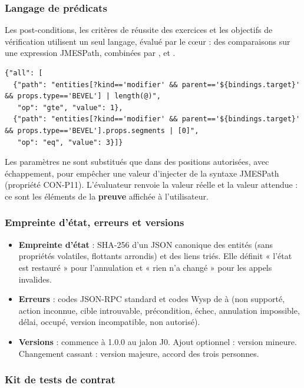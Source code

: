 \subsubsection{Langage de prédicats}

Les post-conditions, les critères de réussite des exercices et les objectifs de vérification utilisent un seul langage, évalué par le cœur : des comparaisons sur une expression JMESPath, combinées par ,  et .

\begin{lstlisting}[language={}]
{"all": [
  {"path": "entities[?kind=='modifier' && parent=='${bindings.target}' && props.type=='BEVEL'] | length(@)",
   "op": "gte", "value": 1},
  {"path": "entities[?kind=='modifier' && parent=='${bindings.target}' && props.type=='BEVEL'].props.segments | [0]",
   "op": "eq", "value": 3}]}
\end{lstlisting}

Les paramètres ne sont substitués que dans des positions autorisées, avec échappement, pour empêcher une valeur d'injecter de la syntaxe JMESPath (propriété CON-P11). L'évaluateur renvoie la valeur réelle et la valeur attendue : ce sont les éléments de la \textbf{preuve} affichée à l'utilisateur.

\subsubsection{Empreinte d'état, erreurs et versions}

\begin{itemize}[leftmargin=1.2em]
  \item \textbf{Empreinte d'état} : SHA-256 d'un JSON canonique des entités (sans propriétés volatiles, flottants arrondis) et des liens triés. Elle définit « l'état est restauré » pour l'annulation et « rien n'a changé » pour les appels invalides.
  \item \textbf{Erreurs} : codes JSON-RPC standard et codes Wysp de  à  (non supporté, action inconnue, cible introuvable, précondition, échec, annulation impossible, délai, occupé, version incompatible, non autorisé).
  \item \textbf{Versions} :  commence à 1.0.0 au jalon J0. Ajout optionnel : version mineure. Changement cassant : version majeure, accord des trois personnes.
\end{itemize}

\subsubsection{Kit de tests de contrat}

